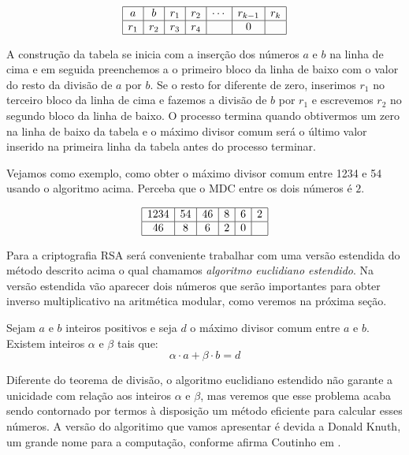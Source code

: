 \[
\begin{array}{|c|c|c|c|c|c|c|}\hline
	a     & b     & r_{1} & r_{2} & \cdots & r_{k-1} & r_{k}\\ \hline
	r_{1}	& r_{2} & r_{3} & r_{4} &        & 0       &  \\ \hline
\end{array}
\]

A constru\c{c}\~{a}o da tabela se inicia com a inser\c{c}\~{a}o dos n\'{u}meros $a$ e $b$ na linha de cima e em seguida preenchemos
a o primeiro bloco da linha de baixo com o valor do resto da divis\~{a}o de $a$ por $b$. Se o resto for diferente de zero, 
inserimos $r_{1}$ no terceiro bloco da linha de cima e fazemos a divis\~{a}o de $b$ por $r_{1}$ e escrevemos
$r_{2}$ no segundo bloco da linha de baixo.
O processo termina quando obtivermos um zero na linha de baixo da tabela e o m\'{a}ximo divisor comum ser\'{a} o 
\'{u}ltimo valor inserido na primeira linha da tabela antes do processo terminar. 

Vejamos como exemplo, como obter o m\'{a}ximo divisor comum entre 1234 e 54 usando o algoritmo acima. Perceba que o MDC entre os dois n\'umeros \'e $2$.

\[
\begin{array}{|c|c|c|c|c|c|}\hline
	1234 & 54 & 46 & 8 & 6 & 2 \\ \hline
	46   & 8  & 6  & 2 & 0 &   \\ \hline
\end{array}
\]

Para a criptografia RSA ser\'{a} conveniente trabalhar com uma vers\~ao estendida do m\'etodo descrito acima o qual 
chamamos \textit{algoritmo euclidiano estendido}.
Na vers\~{a}o estendida v\~{a}o aparecer dois n\'{u}meros que ser\~{a}o importantes para obter inverso multiplicativo 
na aritm\'{e}tica modular, como veremos na pr\'{o}xima se\c{c}\~{a}o.


\begin{Th}\label{alg.eucl.est.}
Sejam $a$ e $b$ inteiros positivos e seja $d$ o m\'aximo divisor comum entre $a$ e $b$. Existem
inteiros $\alpha$ e $\beta$ tais que:
	$$\alpha\cdot a+\beta\cdot b=d$$
\end{Th}


Diferente do teorema de divis\~ao, o algoritmo euclidiano estendido n\~ao garante a unicidade 
com rela\c{c}\~ao aos inteiros $\alpha$ e $\beta$, mas veremos que esse problema acaba sendo 
contornado por termos \`{a} disposi\c{c}\~ao um m\'etodo eficiente para calcular esses n\'umeros.
A vers\~{a}o do algoritimo que vamos apresentar \'{e} devida a Donald Knuth, um grande nome 
para a computa\c{c}\~{a}o, conforme afirma Coutinho em \cite{cou:2014}.


